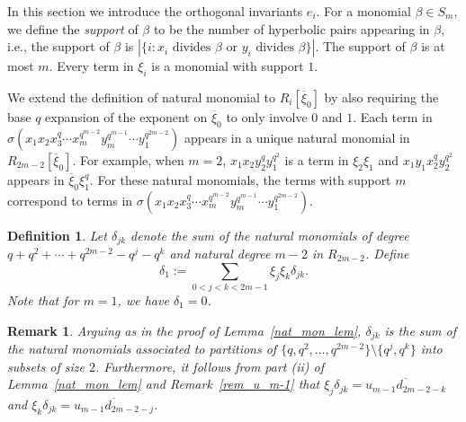 \documentclass{amsart}
\newtheorem{remark}[subsection]{Remark}
\newtheorem{definition}[subsection]{Definition}
\begin{document}
In this section we introduce the orthogonal invariants $e_i$.
For a monomial $\beta\in S_m$, we define the {\it support} of $\beta$ to be the number of hyperbolic pairs appearing in $\beta$,
i.e., the support of 
$\beta$ is $|\{i : x_i \text{ divides }\beta \text{ or } y_i \text{ divides }\beta\}|$.
The support of $\beta$ is at most $m$. Every term in $\xi_i$ is a monomial with support $1$.

We extend the definition of natural monomial to 
$R_{i}[\overline{\xi}_0]$ by also requiring the base $q$
expansion of the exponent on $\overline{\xi}_0$ to only 
involve $0$ and $1$.
Each term in $\sigma(x_1 x_2 x_3^q\cdots x_m^{q^{m-2}}y_m^{q^{m-1}}\cdots y_1^{q^{2m-2}})$ appears in a unique natural monomial in 
$R_{2m-2}[\overline{\xi}_0]$.
For example, when $m=2$, $x_1x_2y_2^qy_1^{q^2}$ is a term in $\xi_2\xi_1$ and $x_1y_1x_2^qy_2^{q^2}$ appears in $\overline{\xi}_0\xi_1^q$.
For these natural monomials, the terms with support $m$ correspond to terms in  $\sigma(x_1 x_2 x_3^q\cdots x_m^{q^{m-2}}y_m^{q^{m-1}}\cdots y_1^{q^{2m-2}})$.

\begin{definition}\label{delta_one_def} Let $\delta_{jk}$ denote the sum of the natural monomials of degree $q+q^2+\cdots +q^{2m-2}-q^j-q^k$ and natural degree $m-2$ in $R_{2m-2}$.
Define
$$\delta_1:=\sum_{0<j<k<2m-1}\xi_j\xi_k\delta_{jk}.$$
Note that for $m=1$, we have $\delta_1=0$.
\end{definition}

\begin{remark}\label{delta_one_rem} Arguing as in the proof of Lemma~\ref{nat_mon_lem}, $\delta_{jk}$ is the sum of the natural monomials associated to partitions
of $\{q,q^2,\ldots,q^{2m-2}\}\setminus\{q^j,q^k\}$ into subsets of size $2$. Furthermore,
it follows from part (ii) of Lemma~\ref{nat_mon_lem} and 
Remark~\ref{rem_u_m-1} that $\xi_j\delta_{jk}=\overline{u_{m-1}d_{2m-2-k}}$
and $\xi_k\delta_{jk}=\overline{u_{m-1}d_{2m-2-j}}$.
\end{remark}
\end{document}
